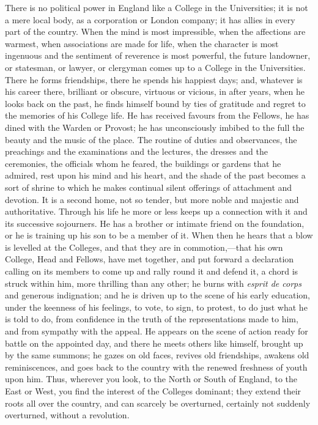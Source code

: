 There is no political power in
England like a College in the Universities; it is not a mere local
body, as a corporation or London company; it has allies in every part
of the country. When the mind is most impressible, when the affections
are warmest, when associations are made for life, when the character
is most ingenuous and the sentiment of reverence is most
powerful, the future landowner, or statesman, or lawyer, or clergyman
comes up to a College in the Universities. There he forms friendships,
there he spends his happiest days; and, whatever is his career there,
brilliant or obscure, virtuous or vicious, in after years, when he
looks back on the past, he finds himself bound by ties of gratitude
and regret to the memories of his College life. He has received
favours from the Fellows, he has dined with the Warden or Provost; he
has unconsciously imbibed to the full the beauty and the music of the
place. The routine of duties and observances, the preachings and the
examinations and the lectures, the dresses and the ceremonies, the
officials whom he feared, the buildings or gardens that he admired,
rest upon his mind and his heart, and the shade of the past becomes a
sort of shrine to which he makes continual silent offerings of
attachment and devotion. It is a second home, not so tender, but more
noble and majestic and authoritative. Through his life he more or less
keeps up a connection with it and its successive sojourners. He has a
brother or intimate friend on the foundation, or he is training up his
son to be a member of it. When then he hears that a blow is levelled
at the Colleges, and that they are in commotion,—that his own
College, Head and Fellows, have met together, and put forward a
declaration calling on its members to come up and rally round it and
defend it, a chord is struck within him, more thrilling than any
other; he burns with \emph{esprit de corps} and generous indignation;
and he is driven up to the scene of his early education, under the
keenness of his feelings, to vote, to sign, to protest, to do just
what he is told to do, from confidence in the truth of the
representations made to him, and from sympathy with the appeal. He
appears on the scene of action ready for battle on
the appointed day, and there he meets others like himself, brought up
by the same summons; he gazes on old faces, revives old friendships,
awakens old reminiscences, and goes back to the country with the
renewed freshness of youth upon him. Thus, wherever you look, to the
North or South of England, to the East or West, you find the interest
of the Colleges dominant; they extend their roots all over the
country, and can scarcely be overturned, certainly not suddenly
overturned, without a revolution.


